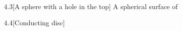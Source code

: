\documentclass[12pt]{article}
\begin{document}
\begin{problem}{4.3}[A sphere with a hole in the top]
A spherical surface of
\begin{solution}
\end{solution}
\end{problem}
\begin{problem}{4.4}[Conducting disc]
\begin{solution}
\end{solution}
\end{problem}
\end{document}
